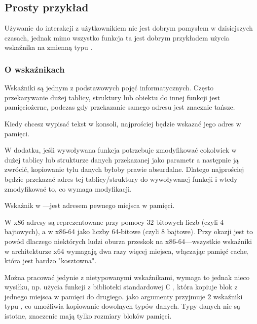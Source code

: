 \subsection{Prosty przykład}



Używanie \scanf do interakcji z użytkownikiem nie jest dobrym pomysłem w dzisiejszych czasach, jednak mimo wszystko funkcja ta jest dobrym przykładem użycia wskaźnika na zmienną typu  \Tint.

\subsubsection{O wskaźnikach}
\myindex{\CLanguageElements!\Pointers}

Wskaźniki są jednym z podstawowych pojęć informatycznych. Często przekazywanie dużej tablicy, struktury lub obiektu do innej funkcji jest pamięciożerne, podczas gdy przekazanie samego adresu jest znacznie tańsze.

Kiedy chcesz wypisać tekst w konsoli, najprościej będzie wskazać jego adres w pamięci.

W dodatku, jeśli wywoływana funkcja potrzebuje zmodyfikować cokolwiek w dużej tablicy lub strukturze danych przekazanej jako parametr a następnie ją zwrócić, kopiowanie tylu danych byłoby prawie absurdalne. Dlatego najprościej będzie przekazać adres tej tablicy/struktury do wywoływanej funkcji i wtedy zmodyfikować to, co wymaga modyfikacji.

Wskaźnik w \CCpp---jest adresem pewnego miejsca w pamięci.

W x86 adresy są reprezentowane przy pomocy 32-bitowych liczb (czyli 4 bajtowych), a w x86-64 jako liczby 64-bitowe (czyli 8 bajtowe). Przy okazji jest to powód dlaczego niektórych ludzi oburza przeskok na x86-64---wszystkie wskaźniki w architekturze x64 wymagają dwa razy więcej miejsca, włączając pamięć cache, która jest bardzo "kosztowna".

Można pracować jedynie z nietypowanymi wskaźnikami, wymaga to jednak nieco wysiłku, np. użycia funkcji z biblioteki standardowej C , która kopiuje blok z jednego miejsca w pamięci do drugiego.  jako argumenty przyjmuje 2 wskaźniki typu , co umożliwia kopiowanie dowolnych typów danych. Typy danych nie są istotne, znaczenie mają tylko rozmiary bloków pamięci.

